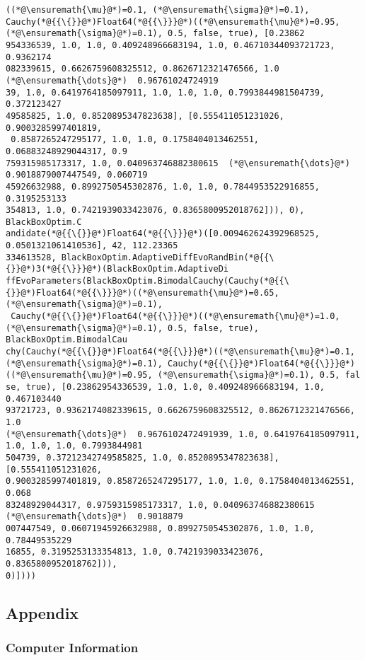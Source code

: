 \documentclass[12pt,a4paper]{article}
\begin{document}
\begin{lstlisting}
((*@\ensuremath{\mu}@*)=0.1, (*@\ensuremath{\sigma}@*)=0.1), Cauchy(*@{{\{}}@*)Float64(*@{{\}}}@*)((*@\ensuremath{\mu}@*)=0.95, (*@\ensuremath{\sigma}@*)=0.1), 0.5, false, true), [0.23862
954336539, 1.0, 1.0, 0.409248966683194, 1.0, 0.46710344093721723, 0.9362174
082339615, 0.6626759608325512, 0.8626712321476566, 1.0  (*@\ensuremath{\dots}@*)  0.96761024724919
39, 1.0, 0.6419764185097911, 1.0, 1.0, 1.0, 0.7993844981504739, 0.372123427
49585825, 1.0, 0.8520895347823638], [0.555411051231026, 0.9003285997401819,
 0.8587265247295177, 1.0, 1.0, 0.1758404013462551, 0.06883248929044317, 0.9
759315985173317, 1.0, 0.040963746882380615  (*@\ensuremath{\dots}@*)  0.9018879007447549, 0.060719
45926632988, 0.8992750545302876, 1.0, 1.0, 0.7844953522916855, 0.3195253133
354813, 1.0, 0.7421939033423076, 0.8365800952018762])), 0), BlackBoxOptim.C
andidate(*@{{\{}}@*)Float64(*@{{\}}}@*)([0.009462624392968525, 0.0501321061410536], 42, 112.23365
334613528, BlackBoxOptim.AdaptiveDiffEvoRandBin(*@{{\{}}@*)3(*@{{\}}}@*)(BlackBoxOptim.AdaptiveDi
ffEvoParameters(BlackBoxOptim.BimodalCauchy(Cauchy(*@{{\{}}@*)Float64(*@{{\}}}@*)((*@\ensuremath{\mu}@*)=0.65, (*@\ensuremath{\sigma}@*)=0.1),
 Cauchy(*@{{\{}}@*)Float64(*@{{\}}}@*)((*@\ensuremath{\mu}@*)=1.0, (*@\ensuremath{\sigma}@*)=0.1), 0.5, false, true), BlackBoxOptim.BimodalCau
chy(Cauchy(*@{{\{}}@*)Float64(*@{{\}}}@*)((*@\ensuremath{\mu}@*)=0.1, (*@\ensuremath{\sigma}@*)=0.1), Cauchy(*@{{\{}}@*)Float64(*@{{\}}}@*)((*@\ensuremath{\mu}@*)=0.95, (*@\ensuremath{\sigma}@*)=0.1), 0.5, fal
se, true), [0.23862954336539, 1.0, 1.0, 0.409248966683194, 1.0, 0.467103440
93721723, 0.9362174082339615, 0.6626759608325512, 0.8626712321476566, 1.0  
(*@\ensuremath{\dots}@*)  0.9676102472491939, 1.0, 0.6419764185097911, 1.0, 1.0, 1.0, 0.7993844981
504739, 0.37212342749585825, 1.0, 0.8520895347823638], [0.555411051231026, 
0.9003285997401819, 0.8587265247295177, 1.0, 1.0, 0.1758404013462551, 0.068
83248929044317, 0.9759315985173317, 1.0, 0.040963746882380615  (*@\ensuremath{\dots}@*)  0.9018879
007447549, 0.06071945926632988, 0.8992750545302876, 1.0, 1.0, 0.78449535229
16855, 0.3195253133354813, 1.0, 0.7421939033423076, 0.8365800952018762])), 
0)])))
\end{lstlisting}



\subsection{Appendix}

\subsubsection{Computer Information}
\end{document}
